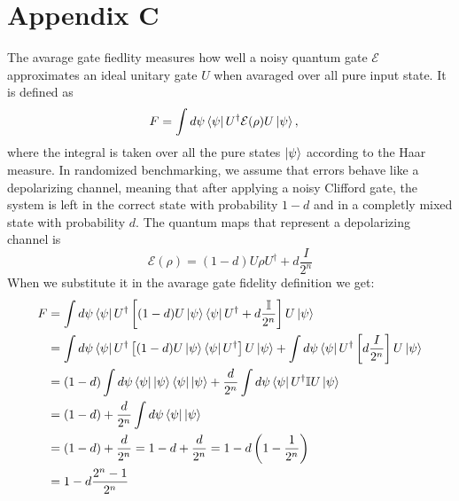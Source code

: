 \chapter*{Appendix C}
\label{app:AppendixC}
The avarage gate fiedlity measures how well a noisy quantum gate $\mathcal{E}$ approximates an ideal unitary gate $U$ when avaraged over all pure input state. It is defined as
\begin{align*}
F &= \int d\psi \bra{\psi} U^\dagger \mathcal{E}(\rho) U \ket{\psi},
\end{align*}
where the integral is taken over all the pure states $\ket{\psi}$ according to the Haar measure.
In randomized benchmarking, we assume that errors behave like a depolarizing channel, meaning that after applying a noisy Clifford gate, the system is left in the correct state with probability $1-d$ and in a completly mixed state with probability $d$.
The quantum maps that represent a depolarizing channel is
\begin{equation}
\mathcal{E}(\rho) = (1-d)U\rho U^\dagger + d\frac{I}{2^n}
\end{equation}
When we substitute it in the avarage gate fidelity definition we get:
\begin{align*}
F &= \int d\psi \bra{\psi} U^\dagger \left[(1-d)U\ket{\psi}\bra{\psi}U^\dagger + d\frac{\mathbb{I}}{2^n}\right] U \ket{\psi}\\
    &= \int d\psi \bra{\psi} U^\dagger \left[(1-d)U\ket{\psi}\bra{\psi}U^\dagger\right] U \ket{\psi} + \int d\psi \bra{\psi} U^\dagger \left[d\frac{I}{2^n}\right] U \ket{\psi}\\
    &= (1-d)\int d\psi \bra{\psi}\ket{\psi}\bra{\psi}\ket{\psi} + \frac{d}{2^n}\int d\psi \bra{\psi}U^\dagger \mathbb{I} U\ket{\psi}\\
    &= (1-d) + \frac{d}{2^n}\int d\psi \bra{\psi}\ket{\psi}\\
    &= (1-d) + \frac{d}{2^n} = 1 - d + \frac{d}{2^n} = 1 - d\left(1 - \frac{1}{2^n}\right)\\
    &= 1 - d\frac{2^n - 1}{2^n}
\end{align*}

